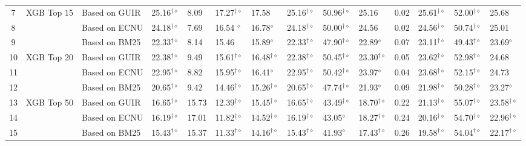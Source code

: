 \begin{table*}
{\begin{tabular}{ccllllllllllll}
\midrule 
7  & \multirow{3}{*}{XGB Top 15}  & Based on GUIR  & 25.16$^{\dagger\diamond}$  & 8.09  & 17.27$^{\dagger\diamond}$  & 17.58  & 25.16$^{\dagger\diamond}$  & 50.96$^{\dagger\diamond}$  & 25.16  & 0.02  & 25.61$^{\dagger\diamond}$  & 52.00$^{\dagger\diamond}$  & 25.68\tabularnewline
8  &  & Based on ECNU  & 24.18$^{\dagger\diamond}$  & 7.69  & 16.54 $^{\diamond}$  & 16.78$^{\diamond}$  & 24.18$^{\dagger\diamond}$  & 50.00$^{\dagger\diamond}$  & 24.56  & 0.02  & 24.56$^{\dagger\diamond}$  & 50.74$^{\dagger\diamond}$  & 25.01\tabularnewline
9  &  & Based on BM25  & 22.33$^{\dagger\diamond}$  & 8.14  & 15.46  & 15.89$^{\diamond}$  & 22.33$^{\dagger\diamond}$  & 47.90$^{\dagger\diamond}$  & 22.89$^{\diamond}$  & 0.07  & 23.11$^{\dagger\diamond}$  & 49.43$^{\dagger\diamond}$  & 23.69$^{\diamond}$\tabularnewline
\midrule
10  & \multirow{3}{*}{XGB Top 20}  & Based on GUIR  & 22.38$^{\dagger\diamond}$  & 9.49  & 15.61$^{\dagger\diamond}$  & 16.48$^{\dagger\diamond}$  & 22.38$^{\dagger\diamond}$  & 50.45$^{\dagger\diamond}$  & 23.30$^{\dagger\diamond}$  & 0.05  & 23.62$^{\dagger\diamond}$  & 52.98$^{\dagger\diamond}$  & 24.68\tabularnewline
11  &  & Based on ECNU  & 22.95$^{\dagger\diamond}$  & 8.82  & 15.95$^{\dagger\diamond}$  & 16.41$^{\diamond}$  & 22.95$^{\dagger\diamond}$  & 50.42$^{\dagger\diamond}$  & 23.97$^{\diamond}$  & 0.04  & 23.68$^{\dagger\diamond}$  & 52.15$^{\dagger\diamond}$  & 24.73\tabularnewline
12  &  & Based on BM25  & 20.65$^{\dagger\diamond}$  & 9.42  & 14.46$^{\dagger\diamond}$  & 15.26$^{\dagger\diamond}$  & 20.65$^{\dagger\diamond}$  & 47.74$^{\dagger\diamond}$  & 21.93$^{\diamond}$  & 0.09  & 21.98$^{\dagger\diamond}$  & 50.28$^{\dagger\diamond}$  & 23.27$^{\diamond}$\tabularnewline
\midrule 
13  & \multirow{3}{*}{XGB Top 50}  & Based on GUIR  & 16.65$^{\dagger\diamond}$  & 15.73  & 12.39$^{\dagger\diamond}$  & 15.45$^{\dagger\diamond}$  & 16.65$^{\dagger\diamond}$  & 43.49$^{\dagger\diamond}$  & 18.70$^{\dagger\diamond}$  & 0.22  & 21.13$^{\dagger\diamond}$  & 55.07$^{\dagger\diamond}$  & 23.58$^{\dagger\diamond}$\tabularnewline
14  &  & Based on ECNU  & 16.19$^{\dagger\diamond}$  & 17.01  & 11.82$^{\dagger\diamond}$  & 14.52$^{\dagger\diamond}$  & 16.19$^{\dagger\diamond}$  & 43.05$^{\diamond}$  & 18.27$^{\dagger\diamond}$  & 0.24  & 20.16$^{\dagger\diamond}$  & 54.70$^{\dagger\diamond}$  & 22.96$^{\dagger\diamond}$\tabularnewline
15  &  & Based on BM25  & 15.43$^{\dagger\diamond}$  & 15.37  & 11.33$^{\dagger\diamond}$  & 14.16$^{\dagger\diamond}$  & 15.43$^{\dagger\diamond}$  & 41.93$^{\diamond}$  & 17.43$^{\dagger\diamond}$  & 0.26  & 19.58$^{\dagger\diamond}$  & 54.04$^{\dagger\diamond}$  & 22.17$^{\dagger\diamond}$\tabularnewline

\end{tabular}}
\end{table*}
